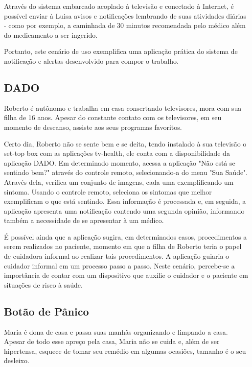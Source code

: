 Através do sistema embarcado acoplado à televisão e conectado à Internet, é
possível enviar à Luisa avisos e notificações lembrando de suas atividades
diárias - como por exemplo, a caminhada de 30 minutos recomendada pelo
médico além do medicamento a ser ingerido.

Portanto, este cenário de uso exemplifica uma aplicação prática do sistema de
notificação e alertas desenvolvido para compor o trabalho.

\subsection{DADO}\label{subsec:dado}

Roberto é autônomo e trabalha em casa consertando televisores, mora com sua
filha de 16 anos. Apesar do constante contato com os televisores, em seu momento
de descanso, assiste aos seus programas favoritos.

Certo dia, Roberto não se sente bem e se deita, tendo instalado à sua televisão
o set-top box com as aplicações tv-health, ele conta com a disponibilidade da
aplicação DADO. Em determinado momento, acessa a aplicação "Não está se sentindo
bem?" através do controle remoto, selecionando-a do menu "Sua Saúde". Através
dela, verifica um conjunto de imagens, cada uma exemplificando um sintoma.
Usando o controle remoto, seleciona os sintomas que melhor exemplificam o que
está sentindo. Essa informação é processada e, em seguida, a aplicação apresenta
uma notificação contendo uma segunda opinião, informando também a necessidade de
se apresentar à um médico.

É possível ainda que a aplicação sugira, em determinados casos, procedimentos a
serem realizados no paciente, momento em que a filha de Roberto teria o papel de
cuidadora informal ao realizar tais procedimentos. A aplicação guiaria o
cuidador informal em um processo passo a passo. Neste cenário,  percebe-se a
importância de contar com um dispositivo que auxilie o cuidador e o paciente em
situações de risco à saúde.

\subsection{Botão de Pânico}\label{subsec:botao-panico}

Maria é dona de casa e passa suas manhãs organizando e limpando a casa. Apesar
de todo esse apreço pela casa, Maria não se cuida e, além de ser hipertensa,
esquece de tomar seu remédio em algumas ocasiões, tamanho é o seu desleixo.


